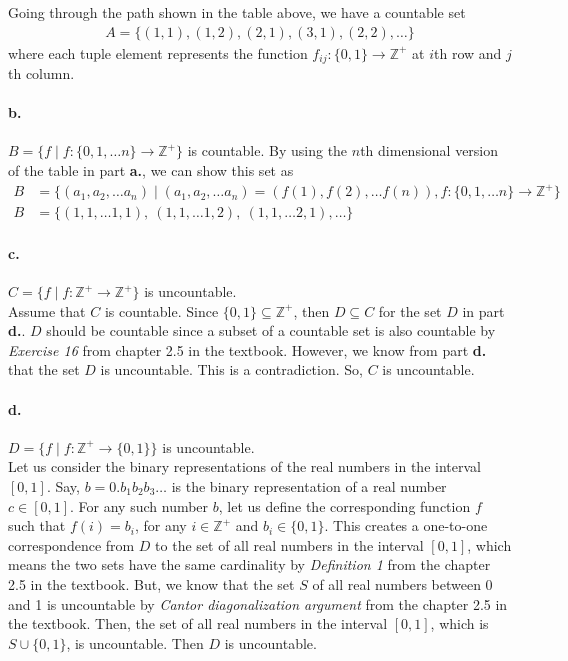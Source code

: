 \documentclass[11pt]{article}
\begin{document}
Going through the path shown in the table above, we have a countable set
\begin{align*}
    A = \{(1, 1), (1, 2), (2, 1), (3, 1), (2, 2), \dots\}
\end{align*}
where each tuple element represents the function $f_{ij}: \{0, 1\} \rightarrow \mathbb{Z}^+$ at $i$th row and $j$th column. \\

\paragraph{b.} $B = \{f \mid f: \{0, 1, \dots n\} \rightarrow \mathbb{Z}^+\}$ is countable. By using the $n$th dimensional version of the table in part \textbf{a.}, we can show this set as
\begin{align*}
    B &= \{(a_1, a_2, \dots a_n) \mid (a_1, a_2, \dots a_n) = (f(1), f(2), \dots f(n)), f: \{0, 1, \dots n\} \rightarrow \mathbb{Z}^+\} \\
    B &= \{(1, 1, \dots 1, 1), \ (1, 1, \dots 1, 2), \ (1, 1, \dots 2, 1), \dots\}
\end{align*}

\paragraph{c.} $C = \{f \mid f: \mathbb{Z}^+ \rightarrow \mathbb{Z}^+\}$ is uncountable. \\
Assume that $C$ is countable. Since $\{0, 1\} \subseteq \mathbb{Z}^+$, then $D \subseteq C$ for the set $D$ in part \textbf{d.}. $D$ should be countable since a subset of a countable set is also countable by \textit{Exercise 16} from chapter 2.5 in the textbook. However, we know from part \textbf{d.} that the set $D$ is uncountable. This is a contradiction. So, $C$ is uncountable. \\

\paragraph{d.} $D = \{f \mid f: \mathbb{Z}^+ \rightarrow \{0, 1\}\}$ is uncountable. \\
Let us consider the binary representations of the real numbers in the interval $[0, 1]$. Say, $b = 0.b_1 b_2 b_3 \dots$ is the binary representation of a real number $c \in [0, 1]$. For any such number $b$, let us define the corresponding function $f$ such that $f(i) = b_i$, for any $i \in \mathbb{Z}^+$ and $b_i \in \{0, 1\}$. This creates a one-to-one correspondence from $D$ to the set of all real numbers in the interval $[0, 1]$, which means the two sets have the same cardinality by \textit{Definition 1} from the chapter 2.5 in the textbook. But, we know that the set $S$ of all real numbers between 0 and 1 is uncountable by \textit{Cantor diagonalization argument} from the chapter 2.5 in the textbook. Then, the set of all real numbers in the interval $[0, 1]$, which is $S \cup \{0, 1\}$, is uncountable. Then $D$ is uncountable.
\end{document}
